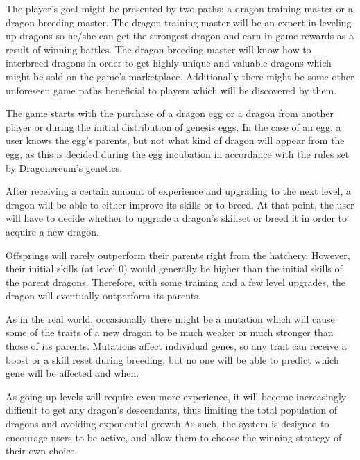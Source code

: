 \documentclass[12pt]{article}
\begin{document}


The player’s goal might be presented by two paths: a dragon training master or a dragon breeding master. The dragon training master will be an expert in leveling up dragons so he/she can get the strongest dragon and earn in-game rewards as a result of winning battles. The dragon breeding master will know how to interbreed dragons in order to get highly unique and valuable dragons which might be sold on the game’s marketplace. Additionally there might be some other unforeseen game paths beneficial to players which will be discovered by them.\par

The game starts with the purchase of a dragon egg or a dragon from another player or during the initial distribution of genesis eggs. In the case of an egg, a user knows the egg’s parents, but not what kind of dragon will appear from the egg, as this is decided during the egg incubation in accordance with the rules set by Dragonereum’s genetics.\par

After receiving a certain amount of experience and upgrading to the next level, a dragon will be able to either improve its skills or to breed. At that point, the user will have to decide whether to upgrade a dragon’s skillset or breed it in order to acquire a new dragon.\par

Offsprings will rarely outperform their parents right from the hatchery. However, their initial skills (at level 0) would generally be higher than the initial skills of the parent dragons. Therefore, with some training and a few level upgrades, the dragon will eventually outperform its parents.\par

As in the real world, occasionally there might be a mutation which will cause some of the traits of a new dragon to be much weaker or much stronger than those of its parents. Mutations affect individual genes, so any trait can receive a boost or a skill reset during breeding, but no one will be able to predict which gene will be affected and when.\par

As going up levels will require even more experience, it will become increasingly difficult to get any dragon’s descendants, thus limiting the total population of dragons and avoiding exponential growth.As such, the system is designed to encourage users to be active, and allow them to choose the winning strategy of their own choice.\par
\end{document}
